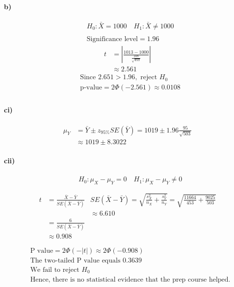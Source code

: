 \documentclass[letterpaper,12pt,titlepage,oneside,final]{book}
\begin{document}
\paragraph{b)}
\begin{align*}
&H_0: \bar{X} = 1000 \quad H_1: \bar{X} \neq 1000\\
\\
&\text{Significance level} = 1.96
\end{align*}
\begin{align*}
t&=\left| \frac{1013 -1000}{\frac{108}{\sqrt{453}}}\right|\\
&\approx 2.561
\end{align*}
\begin{align*}
&\text{Since } 2.651 > 1.96, \text{ reject } H_0\\
&\text{p-value} = 2\Phi(-2.561) \approx 0.0108\\
\end{align*}
\paragraph{ci)}
\begin{align*}
\mu_Y& = \bar{Y}\pm z_{95\%}SE(\bar{Y})= 1019\pm 1.96\frac{95}{\sqrt{503}}\\
&\approx 1019 \pm 8.3022
\end{align*}
\paragraph{cii)}
\begin{align*}
&H_0: \mu_X - \mu_Y = 0 \quad H_1: \mu_X - \mu_Y\neq 0\\
\\
\end{align*}
\begin{align*}
t& = \frac{\bar{X}-\bar{Y}}{SE(\bar{X}-\bar{Y})} &SE(\bar{X}-\bar{Y})= \sqrt{\frac{s_X^2}{n_X}+\frac{s_Y^2}{n_Y}} = \sqrt{\frac{11664}{453}+\frac{9025}{503}} \\
&&\approx 6.610 \\
&=\frac{6}{SE(\bar{X}-\bar{Y})}\\
&\approx 0.908\\
\\
\end{align*}
\begin{align*}
&\text{P value} =2\Phi(-|t|) \approx 2\Phi(-0.908)\\
&\text{The two-tailed P value equals 0.3639}\\
&\text{We fail to reject }H_0\\
&\text{Hence, there is no statistical evidence that the prep course helped.}
\end{align*}
\end{document}
